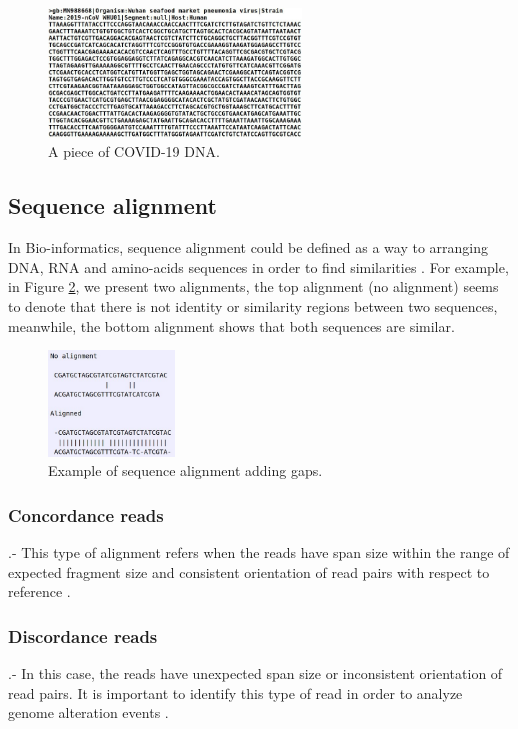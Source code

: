 \documentclass{svproc}
\begin{document}
\begin{figure}[H]
	\centering
	\includegraphics[width=0.6\textwidth]{img/splitthreader/dna}
	\caption{A piece of COVID-19 DNA.}
	\label{fig:dna}
\end{figure}

\subsection{Sequence alignment}
In Bio-informatics, sequence alignment could be defined as a way to arranging DNA, RNA and amino-acids  sequences in order to find similarities \cite{xiong2006essential}. For example, in Figure \ref{fig:al1}, we present two alignments, the top alignment (no alignment) seems to denote that there is not identity or similarity regions between two sequences, meanwhile, the bottom alignment shows that both sequences are similar.


\begin{figure}[h]
	\centering
	\includegraphics[width=0.3\textwidth]{img/splitthreader/al1}
	\caption{Example of sequence alignment adding gaps.}
	\label{fig:al1}
\end{figure}

\subsubsection{Concordance reads}
.- This type of alignment refers when the reads have span size within the range of expected fragment size and consistent orientation of read pairs with respect to reference \cite{alig_2021}.

\subsubsection{Discordance reads}
.- In this case, the reads have unexpected span size or inconsistent orientation of read pairs. It is important to identify this type of read in order to analyze genome alteration events \cite{alig_2021}.
\end{document}
